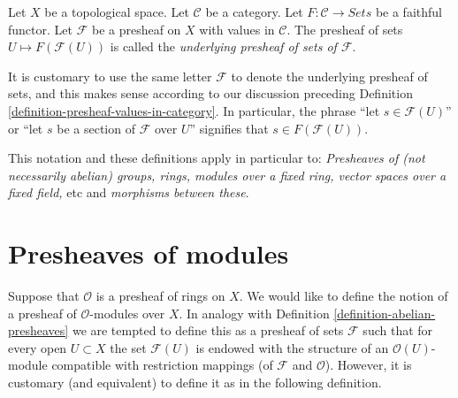 \begin{definition}
\label{definition-underlying-presheaf-sets}
Let $X$ be a topological space. Let $\mathcal{C}$ be a category.
Let $F : \mathcal{C} \to \textit{Sets}$ be a faithful functor.
Let $\mathcal{F}$ be a presheaf on $X$ with values in $\mathcal{C}$.
The presheaf of sets $U \mapsto F(\mathcal{F}(U))$
is called the {\it underlying presheaf of sets of $\mathcal{F}$}.
\end{definition}

\noindent
It is customary to use the same letter $\mathcal{F}$ to denote
the underlying presheaf of sets, and this makes
sense according to our discussion preceding
Definition \ref{definition-presheaf-values-in-category}.
In particular, the phrase ``let $s \in \mathcal{F}(U)$''
or ``let $s$ be a section of $\mathcal{F}$ over $U$'' signifies
that $s \in F(\mathcal{F}(U))$.

\medskip\noindent
This notation and these definitions apply in particular to:
{\it Presheaves of (not necessarily abelian) groups, rings, modules
over a fixed ring, vector spaces over a fixed field, } etc and
{\it morphisms between these}.

\section{Presheaves of modules}
\label{section-presheaves-modules}

\noindent
Suppose that $\mathcal{O}$ is a presheaf of rings on $X$.
We would like to define the notion of a presheaf of
$\mathcal{O}$-modules over $X$. In analogy with Definition
\ref{definition-abelian-presheaves} we are tempted to define
this as a presheaf of sets $\mathcal{F}$ such that for every open
$U \subset X$ the set $\mathcal{F}(U)$ is endowed with the structure
of an $\mathcal{O}(U)$-module compatible with restriction mappings
(of $\mathcal{F}$ and $\mathcal{O}$). However, it is customary
(and equivalent) to define it as in the following definition.

